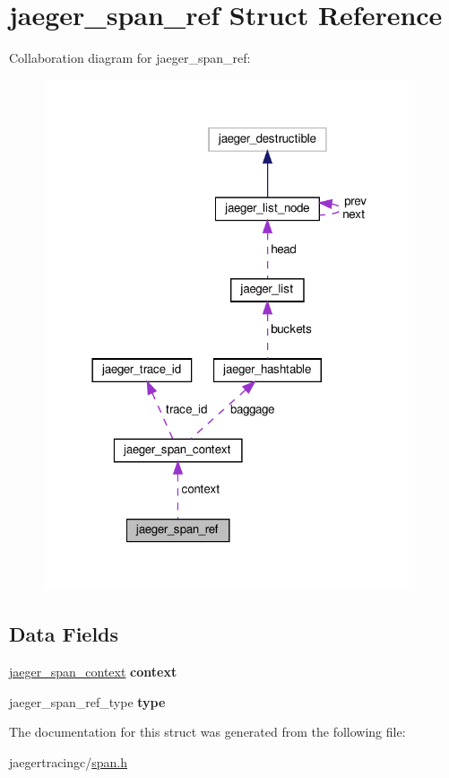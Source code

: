 \hypertarget{structjaeger__span__ref}{}\section{jaeger\+\_\+span\+\_\+ref Struct Reference}
\label{structjaeger__span__ref}


Collaboration diagram for jaeger\+\_\+span\+\_\+ref\+:\nopagebreak
\begin{figure}[H]
\begin{center}
\leavevmode
\includegraphics[width=310pt]{structjaeger__span__ref__coll__graph}
\end{center}
\end{figure}
\subsection*{Data Fields}
\begin{DoxyCompactItemize}
\item 
\mbox{\label{structjaeger__span__ref_a35959d629d46786a74f76844f39cd18a}} 
\mbox{\hyperlink{structjaeger__span__context}{jaeger\+\_\+span\+\_\+context}} {\bfseries context}
\item 
\mbox{\label{structjaeger__span__ref_a465808f3eb23d6d5f1b0672d0f533305}} 
jaeger\+\_\+span\+\_\+ref\+\_\+type {\bfseries type}
\end{DoxyCompactItemize}


The documentation for this struct was generated from the following file\+:\begin{DoxyCompactItemize}
\item 
jaegertracingc/\mbox{\hyperlink{span_8h}{span.\+h}}\end{DoxyCompactItemize}
